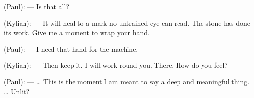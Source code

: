 \begin{room}
\centerline{}

(Paul): --- Is that all?

(Kylian): --- It will heal to a mark no untrained eye can read. The stone has done its work. Give me a moment to wrap your hand.

(Paul): --- I need that hand for the machine.

(Kylian): --- Then keep it. I will work round you. There. How do you feel?

(Paul): --- \ldots{} This is the moment I am meant to say a deep and meaningful thing. \ldots{} Unlit?

\centerline{}

\end{room}
